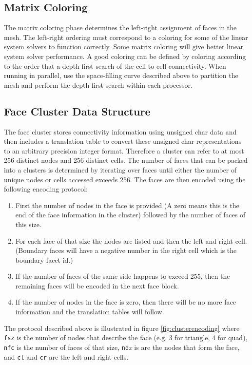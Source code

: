 \documentclass{article}
\begin{document}
\subsection{Matrix Coloring}

The matrix coloring phase determines the left-right assignment of
faces in the mesh.  The left-right ordering must correspond to a
coloring for some of the linear system solvers to function correctly.
Some matrix coloring will give better linear system solver
performance.  A good coloring can be defined by coloring according to
the order that a depth first search of the cell-to-cell connectivity.
When running in parallel, use the space-filling curve described above
to partition the mesh and perform the depth first search within each
processor.

\subsection{Face Cluster Data Structure}

The face cluster stores connectivity information using unsigned
char data and then includes a translation table to convert these
unsigned char representations to an arbitrary precision integer
format.  Therefore a cluster can refer to at most 256 distinct nodes
and 256 distinct cells.  The number of faces that can be packed into a
clusters is determined by iterating over faces until either the number
of unique nodes or cells accessed exceeds 256.  The faces are then
encoded using the following encoding protocol:
\begin{enumerate}
  \item First the number of nodes in the face is provided (A zero
    means this is the end of the face information in the cluster)
    followed by the number of faces of this size.
  \item For each face of that size the nodes are listed and then the
    left and right cell. (Boundary faces will have a negative number in
    the right cell which is the boundary facet id.)
  \item If the number of faces of the same side happens to exceed 255,
    then the remaining faces will be encoded in the next face block.
  \item If the number of nodes in the face is zero, then there will be
    no more face information and the translation tables will follow.
\end{enumerate}

The protocol described above is illustrated in figure
\ref{fig:clusterencoding} where {\tt fsz} is the number of nodes that
describe the face (e.g. 3 for triangle, 4 for quad), {\tt nfc} is the
number of faces of that size, {\tt nd}{\em x} is are the nodes that
form the face, and {\tt cl} and {\tt cr} are the left and right cells.
\end{document}
